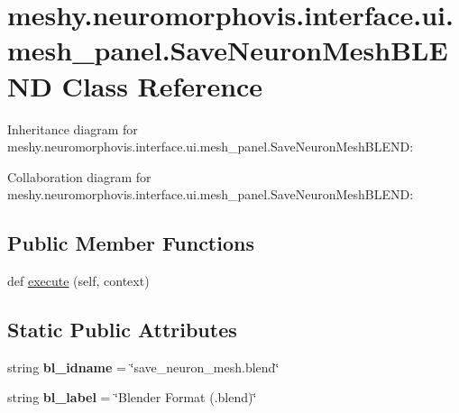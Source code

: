 \hypertarget{classmeshy_1_1neuromorphovis_1_1interface_1_1ui_1_1mesh__panel_1_1SaveNeuronMeshBLEND}{}\section{meshy.\+neuromorphovis.\+interface.\+ui.\+mesh\+\_\+panel.\+Save\+Neuron\+Mesh\+B\+L\+E\+ND Class Reference}
\label{classmeshy_1_1neuromorphovis_1_1interface_1_1ui_1_1mesh__panel_1_1SaveNeuronMeshBLEND}


Inheritance diagram for meshy.\+neuromorphovis.\+interface.\+ui.\+mesh\+\_\+panel.\+Save\+Neuron\+Mesh\+B\+L\+E\+ND\+:


Collaboration diagram for meshy.\+neuromorphovis.\+interface.\+ui.\+mesh\+\_\+panel.\+Save\+Neuron\+Mesh\+B\+L\+E\+ND\+:
\subsection*{Public Member Functions}
\begin{DoxyCompactItemize}
\item 
def \hyperlink{classmeshy_1_1neuromorphovis_1_1interface_1_1ui_1_1mesh__panel_1_1SaveNeuronMeshBLEND_a11335f34e4888edfcf08629f5c853341}{execute} (self, context)
\end{DoxyCompactItemize}
\subsection*{Static Public Attributes}
\begin{DoxyCompactItemize}
\item 
string {\bfseries bl\+\_\+idname} = \char`\"{}save\+\_\+neuron\+\_\+mesh.\+blend\char`\"{}\hypertarget{classmeshy_1_1neuromorphovis_1_1interface_1_1ui_1_1mesh__panel_1_1SaveNeuronMeshBLEND_af2d1da2a4a7915b03f7dddb114fded0a}{}\label{classmeshy_1_1neuromorphovis_1_1interface_1_1ui_1_1mesh__panel_1_1SaveNeuronMeshBLEND_af2d1da2a4a7915b03f7dddb114fded0a}

\item 
string {\bfseries bl\+\_\+label} = \char`\"{}Blender Format (.blend)\char`\"{}\hypertarget{classmeshy_1_1neuromorphovis_1_1interface_1_1ui_1_1mesh__panel_1_1SaveNeuronMeshBLEND_aef51b413d62de33b3c32ebc4432300f6}{}\label{classmeshy_1_1neuromorphovis_1_1interface_1_1ui_1_1mesh__panel_1_1SaveNeuronMeshBLEND_aef51b413d62de33b3c32ebc4432300f6}

\end{DoxyCompactItemize}


